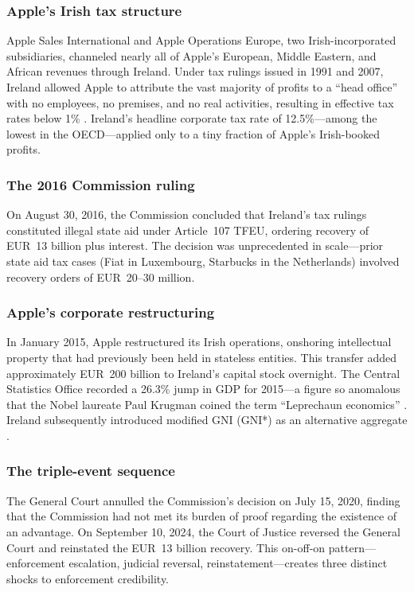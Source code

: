 \documentclass[12pt]{article}
\begin{document}
\subsubsection*{Apple's Irish tax structure} Apple Sales International and Apple Operations Europe, two Irish-incorporated subsidiaries, channeled nearly all of Apple's European, Middle Eastern, and African revenues through Ireland. Under tax rulings issued in 1991 and 2007, Ireland allowed Apple to attribute the vast majority of profits to a ``head office'' with no employees, no premises, and no real activities, resulting in effective tax rates below 1\% \citep{coffill2018apple}. Ireland's headline corporate tax rate of 12.5\%---among the lowest in the OECD---applied only to a tiny fraction of Apple's Irish-booked profits.

\subsubsection*{The 2016 Commission ruling} On August 30, 2016, the Commission concluded that Ireland's tax rulings constituted illegal state aid under Article~107 TFEU, ordering recovery of EUR~13 billion plus interest. The decision was unprecedented in scale---prior state aid tax cases (Fiat in Luxembourg, Starbucks in the Netherlands) involved recovery orders of EUR~20--30 million.

\subsubsection*{Apple's corporate restructuring} In January 2015, Apple restructured its Irish operations, onshoring intellectual property that had previously been held in stateless entities. This transfer added approximately EUR~200 billion to Ireland's capital stock overnight. The Central Statistics Office recorded a 26.3\% jump in GDP for 2015---a figure so anomalous that the Nobel laureate Paul Krugman coined the term ``Leprechaun economics'' \citep{kind2018measuring}. Ireland subsequently introduced modified GNI (GNI*) as an alternative aggregate \citep{lane2017treatment}.

\subsubsection*{The triple-event sequence} The General Court annulled the Commission's decision on July 15, 2020, finding that the Commission had not met its burden of proof regarding the existence of an advantage. On September 10, 2024, the Court of Justice reversed the General Court and reinstated the EUR~13 billion recovery. This on-off-on pattern---enforcement escalation, judicial reversal, reinstatement---creates three distinct shocks to enforcement credibility.
\end{document}
